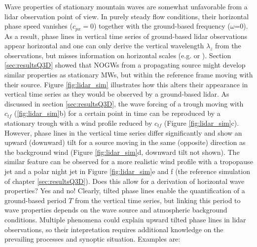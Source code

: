 Wave properties of stationary mountain waves are somewhat unfavorable from a lidar observation point of view. In purely steady flow conditions, their horizontal phase speed vanishes ($c_{px}=0$) together with the ground-based frequency ($\omega$=0). As a result, phase lines in vertical time series of ground-based lidar observations appear horizontal and one can only derive the vertical wavelength $\lambda_z$ from the observations, but misses information on horizontal scales (e.g. \cite[]{dornbrack_interpretation_2017} or \cite[]{reichert_highcadence_2021}). Section \ref{sec:resultsQ3D} showed that NOGWs from a propagating source might develop similar properties as stationary MWs, but within the reference frame moving with their source. Figure \ref{fig:lidar_sim} illustrates how this alters their appearance in vertical time series as they would be observed by a ground-based lidar. As discussed in section \ref{sec:resultsQ3D}, the wave forcing of a trough moving with $c_{tf}$ (\ref{fig:lidar_sim}b) for a certain point in time can be reproduced by a stationary trough with a wind profile reduced by $c_{tf}$ (Figure \ref{fig:lidar_sim}c). However, phase lines in the vertical time series differ significantly and show an upward (downward) tilt for a source moving in the same (opposite) direction as the background wind (Figure \ref{fig:lidar_sim}d, downward tilt not shown). The similar feature can be observed for a more realistic wind profile with a tropopause jet and a polar night jet in Figure \ref{fig:lidar_sim}e and f (the reference simulation of chapter \ref{sec:resultsQ3D}). Does this allow for a derivation of horizontal wave properties? Yes and no! Clearly, tilted phase lines enable the quantification of a ground-based period $T$ from the vertical time series, but linking this period to wave properties depends on the wave source and atmospheric background conditions. Multiple phenomena could explain upward tilted phase lines in lidar observations, so their intepretation requires additional knowledge on the prevailing processes and synoptic situation. Examples are:

